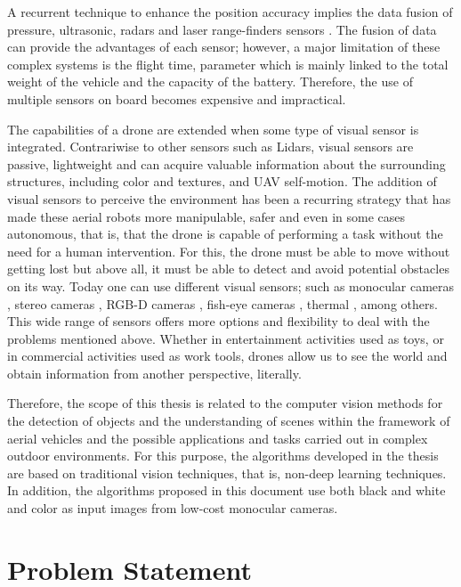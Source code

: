 A recurrent technique to enhance the position accuracy implies the data fusion of pressure, ultrasonic, radars and laser range-finders sensors \cite{Tomic.Schmid.ea:IRAM:2012}. The fusion of data can provide the advantages of each sensor; however, a major limitation of these complex systems is the flight time, parameter which is mainly linked to the total weight of the vehicle and the capacity of the battery. Therefore, the use of multiple sensors on board becomes expensive and impractical.

The capabilities of a drone are extended when some type of visual sensor is integrated. Contrariwise to other sensors such as Lidars, visual sensors are passive, lightweight and can acquire valuable information about the surrounding structures, including color and textures, and UAV self-motion. The addition of visual sensors to perceive the environment has been a recurring strategy that has made these aerial robots more manipulable, safer and even in some cases autonomous, that is, that the drone is capable of performing a task without the need for a human intervention. For this, the drone must be able to move without getting lost but above all, it must be able to detect and avoid potential obstacles on its way. 
Today one can use different visual sensors; such as monocular cameras \cite{Padhy.Xia.ea:TSC:2018}, stereo cameras \cite{Seitz.Curless.ea:CVPR:2006}, RGB-D cameras \cite{Huang.Bachrach.ea:RobR:2017}, fish-eye cameras \cite{Hrabar.Sukhatme:IROS:2004}, thermal \cite{Gaszczak.Breckon.ea:IRCV:2011}, among others. This wide range of sensors offers more options and flexibility to deal with the problems mentioned above. Whether in entertainment activities used as toys, or in commercial activities used as work tools, drones allow us to see the world and obtain information from another perspective, literally.


Therefore, the scope of this thesis is related to the computer vision methods for the detection of objects and the understanding of scenes within the framework of aerial vehicles and the possible applications and tasks carried out in complex outdoor environments. For this purpose, the algorithms developed in the thesis are based on traditional vision techniques, that is, non-deep learning techniques. In addition, the algorithms proposed in this document use both black and white and color as input images from low-cost monocular cameras.

\section{Problem Statement}
 
